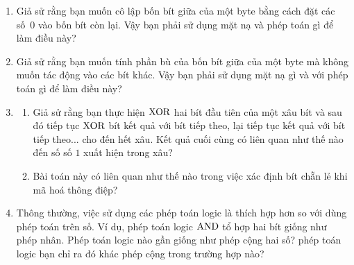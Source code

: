 \begin{enumerate}

\bigskip

\item Giả sử rằng bạn muốn cô lập bốn bít giữa của một byte bằng cách đặt các số~$0$ vào
  bốn bít còn lại. Vậy bạn phải sử dụng mặt nạ và phép toán gì để làm điều này?

\item Giả sử rằng bạn muốn tính phần bù của bốn bít giữa của một byte mà không muốn tác
  động vào các bít khác. Vậy bạn phải sử dụng mặt nạ gì và với phép toán gì để làm điều
  này?

\item
  \begin{enumerate}
  \item Giả sử rằng bạn thực hiện $\operatorname{\mbox{XOR}}$ hai bít đầu tiên của một xâu bít và sau đó tiếp
    tục $\operatorname{\mbox{XOR}}$ bít kết quả với bít tiếp theo, lại tiếp tục kết quả với bít tiếp
    theo... cho đến hết xâu. Kết quả cuối cùng có liên quan như thế nào đến số số $1$ xuất
    hiện trong xâu?

  \item Bài toán này có liên quan như thế nào trong việc xác định bít chẵn lẻ khi mã hoá
    thông điệp?

  \end{enumerate}

\item Thông thường, việc sử dụng các phép toán logic là thích hợp hơn so với dùng phép
  toán trên số. Ví dụ, phép toán logic $\operatorname{\mbox{AND}}$ tổ hợp hai bít giống như phép nhân. Phép
  toán logic nào gần giống như phép cộng hai số? phép toán logic bạn chỉ ra đó khác phép
  cộng trong trường hợp nào?


\end{enumerate}
